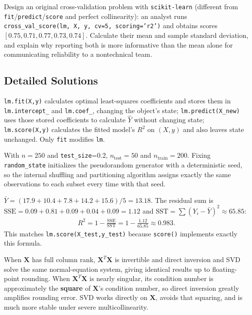 \begin{problema}
\label{prob:0abfd8d}
Design an original cross-validation problem with \texttt{scikit-learn} (different from \texttt{fit}/\texttt{predict}/\texttt{score} and perfect collinearity): an analyst runs \texttt{cross\_val\_score(lm, X, y, cv=5, scoring='r2')} and obtains scores $[0.75,0.71,0.77,0.73,0.74]$. Calculate their mean and sample standard deviation, and explain why reporting both is more informative than the mean alone for communicating reliability to a nontechnical team.
\end{problema}

\subsection*{Detailed Solutions}

\begin{solproblema}
\texttt{lm.fit(X,y)} calculates optimal least-squares coefficients and stores them in \texttt{lm.intercept\_} and \texttt{lm.coef\_}, changing the object's state; \texttt{lm.predict(X\_new)} uses those stored coefficients to calculate $\hat Y$ without changing state; \texttt{lm.score(X,y)} calculates the fitted model's $R^2$ on $(X,y)$ and also leaves state unchanged. Only \texttt{fit} modifies \texttt{lm}.
\end{solproblema}

\begin{solproblema}[prob:ab54576]
With $n=250$ and \texttt{test\_size}=0.2, $n_{\text{test}}=50$ and $n_{\text{train}}=200$. Fixing \texttt{random\_state} initializes the pseudorandom generator with a deterministic seed, so the internal shuffling and partitioning algorithm assigns exactly the same observations to each subset every time with that seed.
\end{solproblema}

\begin{solproblema}[prob:7554cf7]
$\bar Y=(17.9+10.4+7.8+14.2+15.6)/5=13.18$. The residual sum is $\text{SSE}=0.09+0.81+0.09+0.04+0.09=1.12$ and $\text{SST}=\sum(Y_i-\bar Y)^2\approx65.85$:
\begin{align}
R^2=1-\frac{\text{SSE}}{\text{SST}}=1-\frac{1.12}{65.85}\approx0.983.
\end{align}
This matches \texttt{lm.score(X\_test,y\_test)} because \texttt{score()} implements exactly this formula.
\end{solproblema}

\begin{solproblema}[prob:011e008]
When $\mathbf X$ has full column rank, $\mathbf X^T\mathbf X$ is invertible and direct inversion and SVD solve the same normal-equation system, giving identical results up to floating-point rounding. When $\mathbf X^T\mathbf X$ is nearly singular, its condition number is approximately the \textbf{square} of $\mathbf X$'s condition number, so direct inversion greatly amplifies rounding error. SVD works directly on $\mathbf X$, avoids that squaring, and is much more stable under severe multicollinearity.
\end{solproblema}

